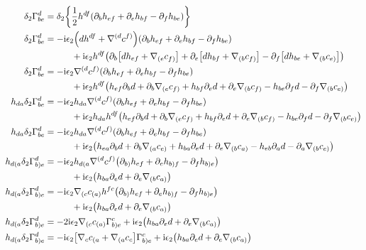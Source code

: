 \begin{align*}
    \delta_2\Gamma^d_{be}&=\delta_2\qty{\frac12h^{df}\qty(\partial_bh_{ef}+\partial_eh_{bf}-\partial_fh_{be})}\\
    \delta_2\Gamma^d_{be}&=-\im\epsilon_2\qty(dh^{df}+\nabla^{(d}c^{f)})\qty(\partial_bh_{ef}+\partial_eh_{bf}-\partial_fh_{be})\\
    &\quad\quad\quad+\im\epsilon_2h^{df}\qty(\partial_b\qty[dh_{ef}+\nabla_{(e}c_{f)}]+\partial_e\qty[dh_{bf}+\nabla_{(b}c_{f)}]-\partial_f\qty[dh_{be}+\nabla_{(b}c_{e)}])\\
    \delta_2\Gamma^d_{be}&=-\im\epsilon_2\nabla^{(d}c^{f)}\qty(\partial_bh_{ef}+\partial_eh_{bf}-\partial_fh_{be})\\
    &\quad\quad\quad+\im\epsilon_2h^{df}\qty(h_{ef}\partial_bd+\partial_b\nabla_{(e}c_{f)}+h_{bf}\partial_ed+\partial_e\nabla_{(b}c_{f)}-h_{be}\partial_fd-\partial_f\nabla_{(b}c_{e)})\\
    h_{da}\delta_2\Gamma^d_{be}&=-\im\epsilon_2h_{da}\nabla^{(d}c^{f)}\qty(\partial_bh_{ef}+\partial_eh_{bf}-\partial_fh_{be})\\
    &\quad\quad\quad+\im\epsilon_2h_{da}h^{df}\qty(h_{ef}\partial_bd+\partial_b\nabla_{(e}c_{f)}+h_{bf}\partial_ed+\partial_e\nabla_{(b}c_{f)}-h_{be}\partial_fd-\partial_f\nabla_{(b}c_{e)})\\
    h_{da}\delta_2\Gamma^d_{be}&=-\im\epsilon_2h_{da}\nabla^{(d}c^{f)}\qty(\partial_bh_{ef}+\partial_eh_{bf}-\partial_fh_{be})\\
    &\quad\quad\quad+\im\epsilon_2\qty(h_{ea}\partial_bd+\partial_b\nabla_{(a}c_{e)}+h_{ba}\partial_ed+\partial_e\nabla_{(b}c_{a)}-h_{eb}\partial_ad-\partial_a\nabla_{(b}c_{e)})\\
    h_{d(a}\delta_2\Gamma^d_{b)e}&=-\im\epsilon_2h_{d(a}\nabla^{(d}c^{f)}\qty(\partial_{b)}h_{ef}+\partial_eh_{b)f}-\partial_fh_{b)e})\\
    &\quad\quad\quad+\im\epsilon_2\qty(h_{ba}\partial_ed+\partial_e\nabla_{(b}c_{a)})\\
    h_{d(a}\delta_2\Gamma^d_{b)e}&=-\im\epsilon_2\nabla_{(c}c_{(a)}h^{fc}\qty(\partial_{b)}h_{ef}+\partial_eh_{b)f}-\partial_fh_{b)e})\\
    &\quad\quad\quad+\im\epsilon_2\qty(h_{ba}\partial_ed+\partial_e\nabla_{(b}c_{a)})\\
    h_{d(a}\delta_2\Gamma^d_{b)e}&=-2\im\epsilon_2\nabla_{(c}c_{(a)}\Gamma^c_{b)e}+\im\epsilon_2\qty(h_{ba}\partial_ed+\partial_e\nabla_{(b}c_{a)})\\
    h_{d(a}\delta_2\Gamma^d_{b)e}&=-\im\epsilon_2\qty[\nabla_{c}c_{(a}+\nabla_{(a}c_{c}]\Gamma^c_{b)e}+\im\epsilon_2\qty(h_{ba}\partial_ed+\partial_e\nabla_{(b}c_{a)})\\

\end{align*}
